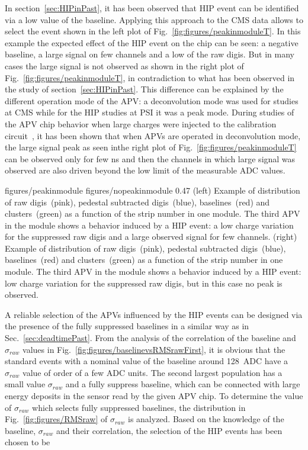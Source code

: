 In section~\ref{sec:HIPinPast}, it has been observed that HIP event can be identified via a low value of the baseline. Applying this approach to the CMS data allows to select the event shown in the left plot of Fig.~\ref{fig:figures/peakinmoduleT}. In this example the expected effect of the HIP event on the chip can be seen: a negative baseline, a large signal on few channels and a low \SD of the raw digis. But in many cases the large signal is not observed as shown in the right plot of Fig.~\ref{fig:figures/peakinmoduleT}, in contradiction to what has been observed in the study of section~\ref{sec:HIPinPast}. This difference can be explained by the different operation mode of the APV: a deconvolution mode was used for studies at CMS while for the HIP studies at PSI it was a peak mode. During studies of the APV chip behavior when large charges were injected to the calibration circuit~\cite{Bainbridge:2002bda}, it has been shown that when APVs are operated in deconvolution mode, the large signal peak as seen inthe right plot of Fig.~\ref{fig:figures/peakinmoduleT} can be observed only for few ns and then the channels in which large signal was observed are also driven beyond the low limit of the measurable ADC values. 

                 {figures/peakinmodule} %
                 {figures/nopeakinmodule} %
                 {0.47}       %
                 {(left) Example of distribution of raw digis~(pink), pedestal subtracted digis~(blue), baselines~(red) and clusters~(green) as a function of the strip number in one module. The third APV in the module shows a behavior induced by a HIP event: a low charge variation for the suppressed raw digis and a large observed signal for few channels. (right) Example of distribution of raw digis~(pink), pedestal subtracted digis~(blue), baselines~(red) and clusters~(green) as a function of the strip number in one module. The third APV in the module shows a behavior induced by a HIP event: low charge variation for the suppressed raw digis, but in this case no peak is observed. } %

A reliable selection of the APVs influenced by the HIP events can be designed via the presence of the fully suppressed baselines in a similar way as in Sec.~\ref{sec:deadtimePast}. From the analysis of the correlation of the baseline and $\sigma_{raw}$ values in Fig.~\ref{fig:figures/baselinevsRMSrawFirst}, it is obvious that the standard events with a nominal value of the baseline around 128~ADC have a $\sigma_{raw}$ value of order of a few ADC units.  The second largest population has a small value $\sigma_{raw}$ and a fully suppress baseline, which can be connected with large energy deposits in the sensor read by the given APV chip. To determine the value of $\sigma_{raw}$ which selects fully suppressed baselines, the distribution in Fig.~\ref{fig:figures/RMSraw} of $\sigma_{raw}$ is analyzed. Based on the knowledge of the baseline, $\sigma_{raw}$ and their correlation, the selection of the HIP events has been chosen to be 

